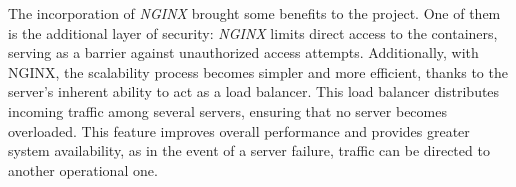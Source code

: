 The incorporation of \textit{NGINX} brought some benefits to the project. One of them is the additional layer of security: \textit{NGINX} limits direct access to the containers, serving as a barrier against unauthorized access attempts. Additionally, with NGINX, the scalability process becomes simpler and more efficient, thanks to the server's inherent ability to act as a load balancer. This load balancer distributes incoming traffic among several servers, ensuring that no server becomes overloaded. This feature improves overall performance and provides greater system availability, as in the event of a server failure, traffic can be directed to another operational one.